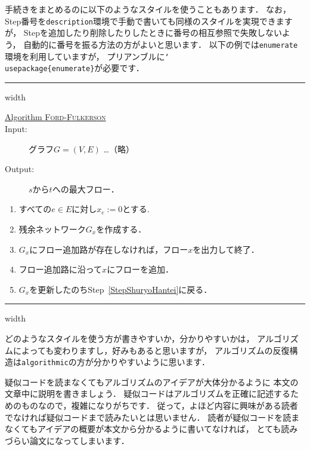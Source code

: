 手続きをまとめるのに以下のようなスタイルを使うこともあります．
なお，Step番号を\texttt{description}環境で手動で書いても同様のスタイルを実現できますが，
Stepを追加したり削除したりしたときに番号の相互参照で失敗しないよう，
自動的に番号を振る方法の方がよいと思います．
以下の例では\texttt{enumerate}環境を利用していますが，
プリアンブルに\texttt{\char`\\usepackage\{enumerate\}}が必要です．
\newpage
\vspace{3mm}
\hrule width \linewidth%
\vspace{2mm}
\begin{description}
 \item[\underline{Algorithm \textsc{Ford-Fulkerson}}] 
 \item[Input:] グラフ$G=(V,E)$ \ldots （略）
 \item[Output:] $s$から$t$への最大フロー．
\end{description}
\begin{enumerate}[{\sf Step 1.}] %
 \item すべての$e \in E$に対し$x_e := 0$とする.
 \item 残余ネットワーク$G_x$を作成する．
 \item \label{StepShuryoHantei}
       $G_x$にフロー追加路が存在しなければ，フロー$x$を出力して終了．
 \item フロー追加路に沿って$x$にフローを追加．
 \item %
       $G_x$を更新したのちStep~\ref{StepShuryoHantei}に戻る．
\end{enumerate}
\vspace{2mm}
\hrule width \linewidth
\vspace{3mm}

どのようなスタイルを使う方が書きやすいか，分かりやすいかは，
アルゴリズムによっても変わりますし，好みもあると思いますが，
アルゴリズムの反復構造は\texttt{algorithmic}の方が分かりやすいように思います．

疑似コードを読まなくてもアルゴリズムのアイデアが大体分かるように
本文の文章中に説明を書きましょう．
疑似コードはアルゴリズムを正確に記述するためのものなので，複雑になりがちです．
従って，よほど内容に興味がある読者でなければ疑似コードまで読みたいとは思いません．
読者が疑似コードを読まなくてもアイデアの概要が本文から分かるように書いてなければ，
とても読みづらい論文になってしまいます．